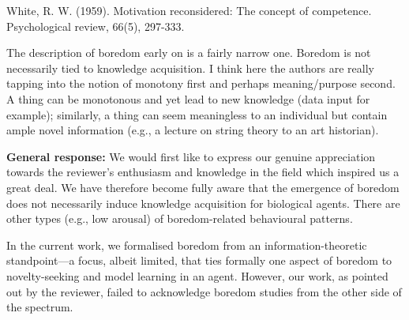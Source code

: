 \documentclass[utf8]{article}
\newenvironment{reply}  
    {\color{Blue}\noindent\newline}
    {\newline}
\begin{document}
        White, R. W. (1959). Motivation reconsidered: The concept of competence. Psychological review, 66(5), 297-333.
         
        The description of boredom early on is a fairly narrow one. Boredom is not necessarily tied to knowledge acquisition. I think here the authors are really tapping into the notion of monotony first and perhaps meaning/purpose second. A thing can be monotonous and yet lead to new knowledge (data input for example); similarly, a thing can seem meaningless to an individual but contain ample novel information (e.g., a lecture on string theory to an art historian). 
        
        \begin{reply}
            \textbf{General response:}
            We would first like to express our genuine appreciation towards the reviewer's enthusiasm and knowledge in the field which inspired us a great deal. We have therefore become fully aware that the emergence of boredom does not necessarily induce knowledge acquisition for biological agents. There are other types (e.g., low arousal) of boredom-related behavioural patterns.
            
            In the current work, we formalised boredom from an information-theoretic standpoint---a focus, albeit limited, that ties formally one aspect of boredom to novelty-seeking and model learning in an agent. However, our work, as pointed out by the reviewer, failed to acknowledge boredom studies from the other side of the spectrum. 
            
            
            
        \end{reply}
        
\end{document}
